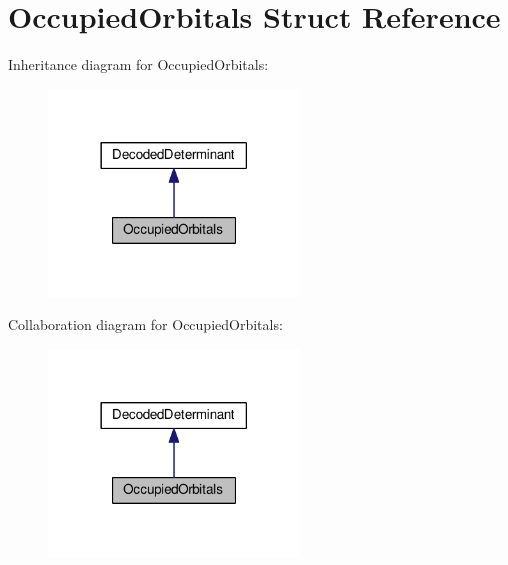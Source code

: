 \hypertarget{structOccupiedOrbitals}{}\section{Occupied\+Orbitals Struct Reference}
\label{structOccupiedOrbitals}


Inheritance diagram for Occupied\+Orbitals\+:
\nopagebreak
\begin{figure}[H]
\begin{center}
\leavevmode
\includegraphics[width=189pt]{structOccupiedOrbitals__inherit__graph}
\end{center}
\end{figure}


Collaboration diagram for Occupied\+Orbitals\+:
\nopagebreak
\begin{figure}[H]
\begin{center}
\leavevmode
\includegraphics[width=189pt]{structOccupiedOrbitals__coll__graph}
\end{center}
\end{figure}
